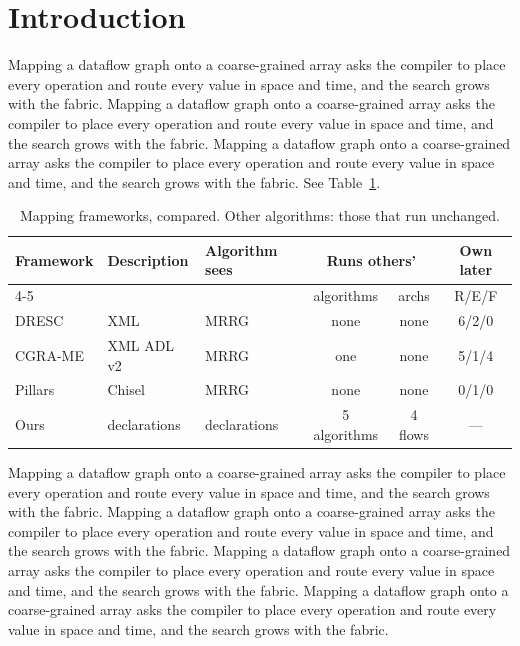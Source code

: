\documentclass[twocolumn]{article}
\begin{document}
\section{Introduction}
Mapping a dataflow graph onto a coarse-grained array asks the compiler to place every operation and route every value in space and time, and the search grows with the fabric. Mapping a dataflow graph onto a coarse-grained array asks the compiler to place every operation and route every value in space and time, and the search grows with the fabric. Mapping a dataflow graph onto a coarse-grained array asks the compiler to place every operation and route every value in space and time, and the search grows with the fabric. See Table~\ref{tab:fw}.

\begin{table}[t]
  \caption{Mapping frameworks, compared. Other algorithms: those that run unchanged.}
  \label{tab:fw}
  \centering
  \footnotesize
  \setlength{\tabcolsep}{3pt}
  \begin{tabular}{@{}lllccc@{}}
    \toprule
    Framework & Description & Algorithm sees & \multicolumn{2}{c}{Runs others'} & Own later \\
    \cmidrule(lr){4-5}
    & & & algorithms & archs & R/E/F \\
    \midrule
    DRESC~\cite{k01} & XML & MRRG & none & none & 6/2/0 \\
    CGRA-ME~\cite{k02,k05} & XML ADL v2 & MRRG & one & none & 5/1/4 \\
    Pillars~\cite{k06} & Chisel & MRRG & none & none & 0/1/0 \\
        \midrule
    Ours & declarations & declarations & 5 algorithms & 4 flows & --- \\
    \bottomrule
  \end{tabular}
\end{table}

Mapping a dataflow graph onto a coarse-grained array asks the compiler to place every operation and route every value in space and time, and the search grows with the fabric. Mapping a dataflow graph onto a coarse-grained array asks the compiler to place every operation and route every value in space and time, and the search grows with the fabric. Mapping a dataflow graph onto a coarse-grained array asks the compiler to place every operation and route every value in space and time, and the search grows with the fabric. Mapping a dataflow graph onto a coarse-grained array asks the compiler to place every operation and route every value in space and time, and the search grows with the fabric.
\end{document}
